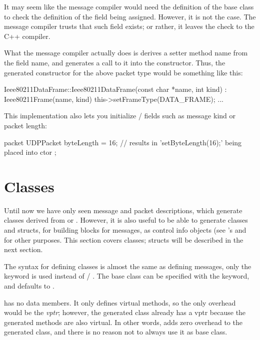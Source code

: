 It may seem like the message compiler would need the definition of the base
class to check the definition of the field being assigned. However, it is
not the case. The message compiler trusts that such field exists; or
rather, it leaves the check to the C++ compiler.

What the message compiler actually does is derives a setter method name
from the field name, and generates a call to it into the constructor.
Thus, the generated constructor for the above packet type would be
something like this:

\begin{cpp}
Ieee80211DataFrame::Ieee80211DataFrame(const char *name, int kind) :
    Ieee80211Frame(name, kind)
{
    this->setFrameType(DATA_FRAME);
    ...
}
\end{cpp}

This implementation also lets you initialize  /
 fields such as message kind or packet length:

\begin{msg}
packet UDPPacket
{
    byteLength = 16;  // results in 'setByteLength(16);' being placed into ctor
};
\end{msg}



\section{Classes}
\label{sec:msg-defs:defining-classes}

Until now we have only seen message and packet descriptions, which generate
classes derived from  or . However, it is
also useful to be able to generate classes and structs, for building blocks
for messages, as control info objects (see 's
 and for other purposes. This section covers
classes; structs will be described in the next section.

The syntax for defining classes is almost the same as defining messages,
only the  keyword is used instead of  /
. The base class can be specified with the 
keyword, and defaults to .

\begin{note}
 has no data members. It only defines virtual methods, so
the only overhead would be the \textit{vptr}; however, the generated class already has
a vptr because the generated methods are also virtual. In other words,
 adds zero overhead to the generated class, and there is no
reason not to always use it as base class.
\end{note}

